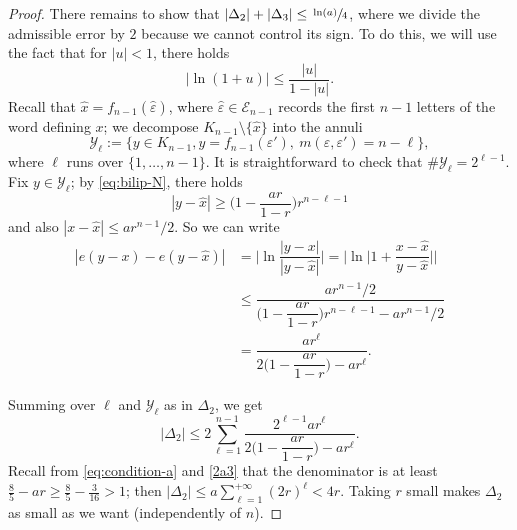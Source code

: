 \documentclass[JEP,XML,SOM,Unicode,published]{cedram}
\let\backslash\setminus
\let\wh\widehat
\numberwithin{equation}{section}
\theoremstyle{plain}
\theoremstyle{definition}
\newcommand{\cY}{{\mathcal Y}}
\newcommand{\cE}{{\mathcal E}}
\begin{document}
\begin{proof}
There remains to show that $|\Delta_2|+ |\Delta_3|\le \sfrac{\ln(a)}{4}$,
where we divide the admissible error by $2$ because we cannot control its sign.
To do this, we will use the fact that for $|u|<1$, there holds
\begin{equation}\label{eq:prop-log}
|\ln (1+u)| \le \dfrac{ |u|}{1-|u|}.
\end{equation}
Recall that $\wh x = f_{n-1}(\wh\varepsilon)$, where $\wh\varepsilon \in \cE_{n-1}$
records the first $n-1$ letters of the word defining $x$; we decompose $K_{n-1}\backslash \{\wh x\}$ into the annuli
\[
\cY_\ell := \big \{ y \in K_{n-1}, y= f_{n-1}(\varepsilon'),\ m(\varepsilon,\varepsilon') = n-\ell \big \},
\]
where $\ell$ runs over $\{1,\dots, n-1\}$. It is straightforward to check that $\# \cY_\ell = 2^{\ell-1}$. Fix $y\in \cY_\ell$; %
by \eqref{eq:bilip-N}, there holds
\begin{equation}\label{eq:dist-ywhx}
|y-\wh x| \ge \Big (1- \dfrac{ar}{1-r}\Big )r^{n-\ell-1}
\end{equation}
and also $|x-\wh x|\le a r^{n-1}/2$. So
we can write\vspace*{-3pt}
\begin{align*}
|e(y-x)-e(y-\wh x)| &= \Big|\ln \dfrac{|y-x|}{|y-\wh x|} \Big |
= \Big|\ln \Big | 1 + \dfrac{x-\wh x}{y-\wh x} \Big| \Big|\\
&\le \dfrac{a r^{n-1}/2}{\Big (1- \dfrac{ar}{1-r}\Big )r^{n-\ell-1}- a r^{n-1}/2}\\
&= \dfrac{a r^\ell}{2 \Big (1- \dfrac{ar}{1-r}\Big )- a r^\ell}.
\end{align*}

Summing over $\ell$ and $\cY_\ell$ as in $\Delta_2$, we get\vspace*{-3pt}
\begin{equation}\label{eq:delta2-bound}
|\Delta_2| \le 2 \sum_{\ell=1}^{n-1} \dfrac{2^{\ell-1} a r^\ell}{2\Big (1- \dfrac{ar}{1-r}\Big )- a r^\ell}.
\end{equation}
Recall from \eqref{eq:condition-a} and \eqref{2a3} that the denominator is at least
\hbox{$\frac85 - a r \!\geq\! \frac85 - \frac{3}{16} \!>\! 1$}; then $|\Delta_2| \le a \sum_{\ell=1}^{+\infty} (2r)^\ell
< 4r$. Taking $r$ small makes $\Delta_2$ as small as we want (independently of $n$).


\end{proof}
\end{document}
